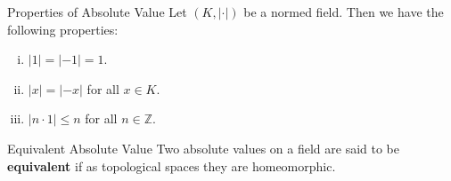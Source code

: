 \begin{proposition}{Properties of Absolute Value}{}
    Let \( (K, |\cdot|) \) be a normed field. Then we have the following properties:
\begin{enumerate}[(i)]
    \item $|1| = \left|-1\right| = 1$.
    \item $|x| = \left|-x\right|$ for all \( x \in K \).
    \item $|n\cdot 1| \le n$ for all \( n \in \mathbb{Z} \).
\end{enumerate}
\end{proposition}

\begin{definition}{Equivalent Absolute Value}{}
    Two absolute values on a field are said to be \textbf{equivalent} if as topological spaces they are homeomorphic. 
\end{definition}

